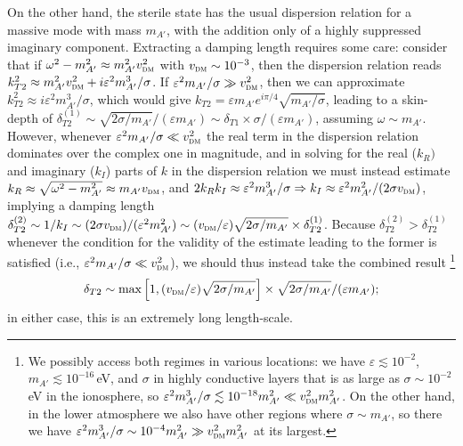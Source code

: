 \documentclass[amsmath,amssymb,aps,10pt,prd,letterpaper,nofootinbib,balancelastpage,notitlepage,superscriptaddress,twocolumn,floatfix]{revtex4-2}
\newcommand{\lb}{\ensuremath{\left}}					%
\newcommand{\rb}{\ensuremath{\right}}					%
\begin{document}
On the other hand, the sterile state has the usual dispersion relation for a massive mode with mass $m_{A'}$, with the addition only of a highly suppressed imaginary component.
Extracting a damping length requires some care: 
consider that if $\omega^2 -m_{A'}^2 \approx m_{A'}^2 v_{\textsc{dm}}^2$ with $v_{\textsc{dm}} \sim 10^{-3}$, then the dispersion relation reads
$k_{T2}^2 \approx m_{A'}^2 v_{\textsc{dm}}^2 + i\varepsilon^2m_{A'}^3/\sigma$.
If $\varepsilon^2m_{A'}/\sigma \gg v_{\textsc{dm}}^2$, then we can approximate $k_{T2}^2 \approx i\varepsilon^2m_{A'}^3/\sigma$, which would give $k_{T2} = \varepsilon m_{A'}e^{i\pi/4}\sqrt{m_{A'}/\sigma}$, leading to a skin-depth of $\delta_{T2}^{(1)} \sim \sqrt{2\sigma/m_{A'}}/( \varepsilon m_{A'}) \sim \delta_{T1} \times \sigma/(\varepsilon m_{A'})$, assuming $\omega \sim m_{A'}$.
However, whenever $\varepsilon^2m_{A'}/\sigma \ll v_{\textsc{dm}}^2$ the real term in the dispersion relation dominates over the complex one in magnitude, and in solving for the real ($k_R)$ and imaginary ($k_I$) parts of $k$ in the dispersion relation we must instead estimate $k_R \approx \sqrt{ \omega^2 - m_{A'}^2} \approx m_{A'} v_{\textsc{dm}}$, and $2k_Rk_I \approx \varepsilon^2m_{A'}^3/\sigma \Rightarrow k_I \approx \varepsilon^2m_{A'}^2/(2\sigma v_{\textsc{dm}})$, implying a damping length $\delta_{T2}^{(2)} \sim 1/k_I \sim (2\sigma v_{\textsc{dm}})/( \varepsilon^2m_{A'}^2) \sim (v_{\textsc{dm}}/\varepsilon) \sqrt{2\sigma/m_{A'}}\times \delta_{T2}^{(1)}$.
Because $\delta_{T2}^{(2)}>\delta_{T2}^{(1)}$ whenever the condition for the validity of the estimate leading to the former is satisfied (i.e., $\varepsilon^2m_{A'}/\sigma \ll v_{\textsc{dm}}^2$), we should thus instead take the combined result%
\footnote{\label{ftnt:bothRegimes}%
    We possibly access both regimes in various locations: we have $\varepsilon \lesssim 10^{-2}$, $m_{A'} \lesssim 10^{-16}\,$eV, and $\sigma$ in highly conductive layers that is as large as $\sigma \sim 10^{-2}$\,eV in the ionosphere, so $\varepsilon^2m_{A'}^3/\sigma \lesssim 10^{-18} m_{A'}^2 \ll v_{\textsc{dm}}^2 m_{A'}^2$.
    On the other hand, in the lower atmosphere we also have other regions where $\sigma \sim m_{A'}$, so there we have $\varepsilon^2m_{A'}^3/\sigma \sim 10^{-4} m_{A'}^2 \gg v_{\textsc{dm}}^2 m_{A'}^2$ at its largest.
} %
\begin{align}
    \delta_{T2} \sim \text{max}\lb[ 1 , (v_{\textsc{dm}}/\varepsilon) \sqrt{2\sigma/m_{A'}} \rb] \times \sqrt{2\sigma/m_{A'}}/( \varepsilon m_{A'});
    \label{eq:deltaT2}
\end{align}
in either case, this is an extremely long length-scale.
\end{document}
